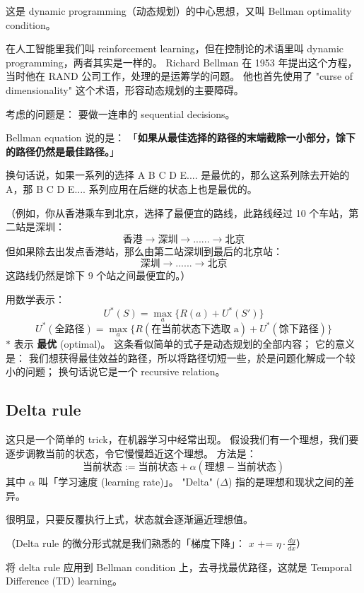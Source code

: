 \documentclass[orivec]{llncs}
\newcommand{\emp}[1]{\textbf{\textcolor{Cerulean}{#1}}}
\begin{document}
这是 dynamic programming（动态规划）的中心思想，又叫 Bellman optimality condition。

在人工智能里我们叫 reinforcement learning，但在控制论的术语里叫 dynamic programming，两者其实是一样的。 Richard Bellman 在 1953 年提出这个方程，当时他在 RAND 公司工作，处理的是运筹学的问题。 他也首先使用了 "curse of dimensionality" 这个术语，形容动态规划的主要障碍。

考虑的问题是： 要做一连串的 sequential decisions。

Bellman equation 说的是： 「\textbf{如果从最佳选择的路径的末端截除一小部分，馀下的路径仍然是最佳路径。}」

换句话说，如果一系列的选择 A B C D E.... 是最优的，那么这系列除去开始的 A，那 B C D E.... 系列应用在后继的状态上也是最优的。

（例如，你从香港乘车到北京，选择了最便宜的路线，此路线经过 10 个车站，第二站是深圳：
$$ \mbox{香港} \rightarrow \mbox{深圳} \rightarrow ... ... \rightarrow \mbox{北京} $$
但如果除去出发点香港站，那么由第二站深圳到最后的北京站：
$$ \mbox{深圳} \rightarrow ... ... \rightarrow \mbox{北京} $$
这路线仍然是馀下 9 个站之间最便宜的。）

用数学表示：
$$ U^*(S) = \max_a \{ R(a) + U^*(S') \} $$
$$ U^*(\mbox{全路径}) = \max_a \{ R(\mbox{在当前状态下选取 a}) + U^*(馀下路径) \} $$
$*$ 表示 \emp{最优} (optimal)。 这条看似简单的式子是动态规划的全部内容； 它的意义是： 我们想获得最佳效益的路径，所以将路径切短一些，於是问题化解成一个较小的问题；  换句话说它是一个 recursive relation。

\subsection{Delta rule}

这只是一个简单的 trick，在机器学习中经常出现。  假设我们有一个理想，我们要逐步调教当前的状态，令它慢慢趋近这个理想。 方法是： 
$$ \mbox{当前状态} := \mbox{当前状态} + \alpha ( \mbox{理想} - \mbox{当前状态}) $$
其中 $\alpha$ 叫「学习速度 (learning rate)」。 "Delta" ($\Delta$) 指的是理想和现状之间的差异。

很明显，只要反覆执行上式，状态就会逐渐逼近理想值。

（Delta rule 的微分形式就是我们熟悉的「梯度下降」： $x \mbox{ += } \eta \cdot \frac{dy}{dx}$）

将 delta rule 应用到 Bellman condition 上，去寻找最优路径，这就是 Temporal Difference (TD) learning。
\end{document}
